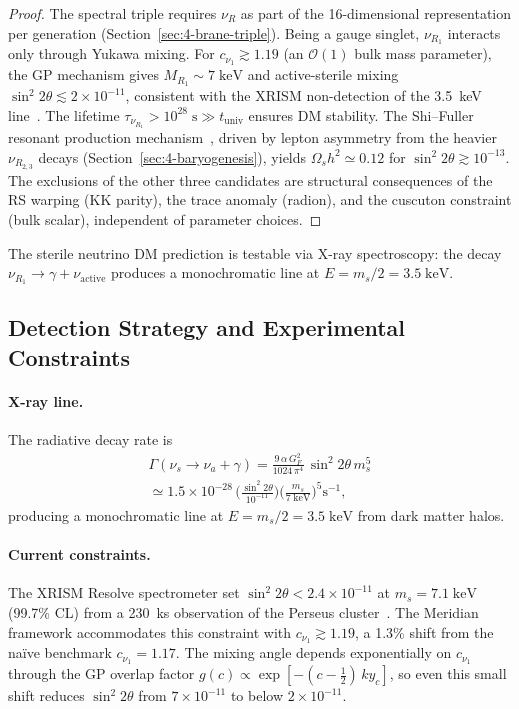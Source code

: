 \begin{proof}
The spectral triple requires $\nu_R$ as part of the 16-dimensional representation per generation (Section~\ref{sec:4-brane-triple}). Being a gauge singlet, $\nu_{R_1}$ interacts only through Yukawa mixing. For $c_{\nu_1} \gtrsim 1.19$ (an $\mathcal{O}(1)$ bulk mass parameter), the GP mechanism gives $M_{R_1} \sim 7\;\mathrm{keV}$ and active-sterile mixing $\sin^2 2\theta \lesssim 2 \times 10^{-11}$, consistent with the XRISM non-detection of the 3.5~keV line~\cite{ch4:XRISM2024}. The lifetime $\tau_{\nu_{R_1}} > 10^{28}\;\mathrm{s} \gg t_{\mathrm{univ}}$ ensures DM stability. The Shi--Fuller resonant production mechanism~\cite{ch4:ShiFuller1999}, driven by lepton asymmetry from the heavier $\nu_{R_{2,3}}$ decays (Section~\ref{sec:4-baryogenesis}), yields $\Omega_s h^2 \simeq 0.12$ for $\sin^2 2\theta \gtrsim 10^{-13}$. The exclusions of the other three candidates are structural consequences of the RS warping (KK parity), the trace anomaly (radion), and the cuscuton constraint (bulk scalar), independent of parameter choices.
\end{proof}

The sterile neutrino DM prediction is testable via X-ray spectroscopy: the decay $\nu_{R_1} \to \gamma + \nu_{\mathrm{active}}$ produces a monochromatic line at $E = m_s/2 = 3.5\;\mathrm{keV}$.

\subsection{Detection Strategy and Experimental Constraints}
\label{sec:4-dm-detection}

\paragraph{X-ray line.} The radiative decay rate is~\cite{ch4:PalWolfenstein1982}
\begin{multline}
  \Gamma(\nu_s \!\to\! \nu_a + \gamma) = \frac{9\, \alpha\, G_F^2}{1024\, \pi^4}\, \sin^2 2\theta\, m_s^5
  \\
  \simeq 1.5 \!\times\! 10^{-28}\, \biggl(\frac{\sin^2 2\theta}{10^{-11}}\biggr) \!\biggl(\frac{m_s}{7\;\mathrm{keV}}\biggr)^{\!5}\mathrm{s}^{-1},
  \label{eq:4-Gamma-rad}
\end{multline}
producing a monochromatic line at $E = m_s/2 = 3.5\;\mathrm{keV}$ from dark matter halos.

\paragraph{Current constraints.} The XRISM Resolve spectrometer set $\sin^2 2\theta < 2.4 \times 10^{-11}$ at $m_s = 7.1\;\mathrm{keV}$ (99.7\% CL) from a 230~ks observation of the Perseus cluster~\cite{ch4:XRISM2024}. The Meridian framework accommodates this constraint with $c_{\nu_1} \gtrsim 1.19$, a 1.3\% shift from the na\"ive benchmark $c_{\nu_1} = 1.17$. The mixing angle depends exponentially on $c_{\nu_1}$ through the GP overlap factor $g(c) \propto \exp[-(c - \tfrac{1}{2})\, k y_c]$, so even this small shift reduces $\sin^2 2\theta$ from $7 \times 10^{-11}$ to below $2 \times 10^{-11}$.


